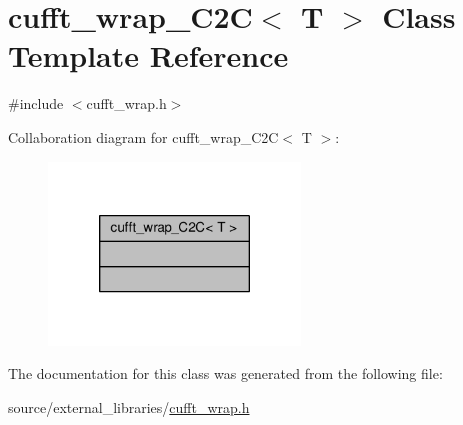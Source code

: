 \hypertarget{classcufft__wrap__C2C}{\section{cufft\-\_\-wrap\-\_\-\-C2\-C$<$ T $>$ Class Template Reference}
\label{classcufft__wrap__C2C}
}


{\ttfamily \#include $<$cufft\-\_\-wrap.\-h$>$}



Collaboration diagram for cufft\-\_\-wrap\-\_\-\-C2\-C$<$ T $>$\-:\nopagebreak
\begin{figure}[H]
\begin{center}
\leavevmode
\includegraphics[width=190pt]{classcufft__wrap__C2C__coll__graph}
\end{center}
\end{figure}


The documentation for this class was generated from the following file\-:\begin{DoxyCompactItemize}
\item 
source/external\-\_\-libraries/\hyperlink{cufft__wrap_8h}{cufft\-\_\-wrap.\-h}\end{DoxyCompactItemize}
